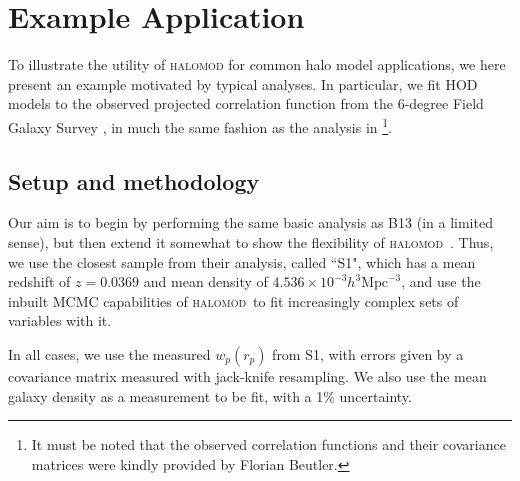 \documentclass[5p]{elsarticle}
\newcommand{\halomod}{\textsc{halomod}}
\begin{document}
%
%
%
%


\section{Example Application}
\label{sec:applications}
To illustrate the utility of \textsc{halomod} for common halo model applications, we here present an example motivated by typical analyses. In particular, we fit HOD models to the observed projected correlation function from the 6-degree Field Galaxy Survey \citep[6dFGS;][]{Jones2009}, in much the same fashion as the analysis in \citet[hereafter B13]{Beutler2013}\footnote{It must be noted that the observed correlation functions and their covariance matrices were kindly provided by Florian Beutler.}. 

\subsection{Setup and methodology}
Our aim is to begin by performing the same basic analysis as B13 (in a limited sense), but then extend it somewhat to show the flexibility of \halomod\  . Thus, we use the closest sample from their analysis, called ``S1", which has a mean redshift of $z=0.0369$ and mean density of $4.536\times10^{-3} h^3 \text{Mpc}^{-3}$, and use the inbuilt MCMC capabilities of \halomod\  to fit increasingly complex sets of variables with it. 

In all cases, we use the measured $w_p(r_p)$ from S1, with errors given by a covariance matrix measured with jack-knife resampling. We also use the mean galaxy density as a measurement to be fit, with a 1\% uncertainty.
\end{document}
